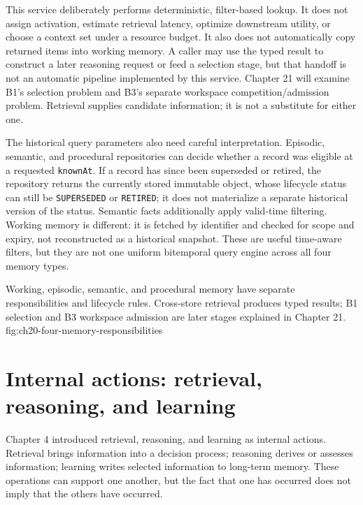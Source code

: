 This service deliberately performs deterministic, filter-based lookup. It does not assign activation, estimate retrieval latency, optimize downstream utility, or choose a context set under a resource budget. It also does not automatically copy returned items into working memory. A caller may use the typed result to construct a later reasoning request or feed a selection stage, but that handoff is not an automatic pipeline implemented by this service. Chapter 21 will examine B1's selection problem and B3's separate workspace competition/admission problem. Retrieval supplies candidate information; it is not a substitute for either one.

The historical query parameters also need careful interpretation. Episodic, semantic, and procedural repositories can decide whether a record was eligible at a requested \texttt{knownAt}. If a record has since been superseded or retired, the repository returns the currently stored immutable object, whose lifecycle status can still be \texttt{SUPERSEDED} or \texttt{RETIRED}; it does not materialize a separate historical version of the status. Semantic facts additionally apply valid-time filtering. Working memory is different: it is fetched by identifier and checked for scope and expiry, not reconstructed as a historical snapshot. These are useful time-aware filters, but they are not one uniform bitemporal query engine across all four memory types.

  {Working, episodic, semantic, and procedural memory have separate responsibilities and lifecycle rules. Cross-store retrieval produces typed results; B1 selection and B3 workspace admission are later stages explained in Chapter 21.}
  {fig:ch20-four-memory-responsibilities}

\section{Internal actions: retrieval, reasoning, and learning}
\label{sec:ch20-internal-actions}

Chapter 4 introduced retrieval, reasoning, and learning as internal actions. Retrieval brings information into a decision process; reasoning derives or assesses information; learning writes selected information to long-term memory. These operations can support one another, but the fact that one has occurred does not imply that the others have occurred.


